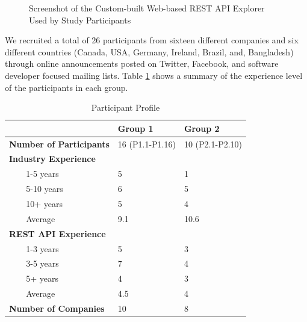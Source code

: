\documentclass[conference]{IEEEtran}
\begin{document}
\begin{figure}[t]
\begin{center}
\end{center}
\caption{Screenshot of the Custom-built Web-based REST API Explorer Used by Study Participants}
\label{fig:api_explorer}
\end{figure}


We recruited a total of 26 participants from sixteen different companies and six different countries (Canada, USA, Germany, Ireland, Brazil, and,
Bangladesh) through online announcements posted on Twitter, Facebook, and software developer focused mailing lists. Table \ref{table:participants} shows a summary of the experience level of the participants in each group.

\begin{table}[!tbh]
  \caption{Participant Profile}
  \label{table:participants}

\begin{tabular}{|p{0.8in} p{.6in} p{0.7in} p{0.7in}|}

\hline
& & \textbf{Group 1} & \textbf{Group 2}\\
\hline
\multicolumn{2}{|l}{\textbf{Number of Participants}} & 16 (P1.1-P1.16) & 10 (P2.1-P2.10) \\
\hline
\multicolumn{4}{|l|}{\textbf{Industry Experience}} \\
& 1-5 years & 5 & 1 \\
& 5-10 years & 6 & 5 \\
& 10+ years & 5 & 4 \\
& Average & 9.1 & 10.6 \\
\hline

\multicolumn{4}{|l|}{\textbf{REST API Experience}} \\
&   1-3 years & 5 & 3 \\
&   3-5 years & 7 & 4 \\
&   5+ years & 4 & 3 \\
&   Average & 4.5 & 4 \\

\hline
\multicolumn{2}{|l}{\textbf{Number of Companies}} & 10 & 8 \\
\hline
\end{tabular}

\end{table}
\end{document}
